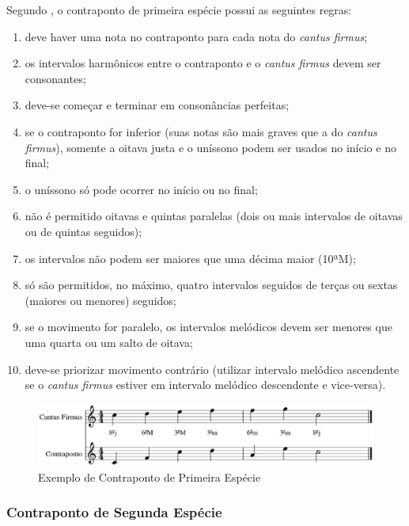         Segundo , o contraponto de primeira espécie possui as seguintes regras:

        \begin{enumerate}
          \item deve haver uma nota no contraponto para cada nota do \textit{cantus firmus};
          \item os intervalos harmônicos entre o contraponto e o \textit{cantus firmus} devem ser consonantes;
          \item deve-se começar e terminar em consonâncias perfeitas;
          \item se o contraponto for inferior (suas notas são mais graves que a do \textit{cantus firmus}), somente a oitava justa e o uníssono podem ser usados no início e no final;
          \item o uníssono só pode ocorrer no início ou no final;
          \item não é permitido oitavas e quintas paralelas (dois ou mais intervalos de oitavas ou de quintas seguidos);
          \item os intervalos não podem ser maiores que uma décima maior (10ªM);
          \item só são permitidos, no máximo, quatro intervalos seguidos de terças ou sextas (maiores ou menores) seguidos;
          \item se o movimento for paralelo, os intervalos melódicos devem ser menores que uma quarta ou um salto de oitava;
          \item deve-se priorizar movimento contrário (utilizar intervalo melódico ascendente se o \textit{cantus firmus} estiver em intervalo melódico descendente e vice-versa).
        \end{enumerate}

        \begin{figure}[htb]
          \centering
          \includegraphics[scale=0.55]{figuras/contrapontoprimeira.eps}
          \caption{Exemplo de Contraponto de Primeira Espécie}
          \label{contrapontoprimeira}
        \end{figure}

      \subsubsection[Contraponto de Segunda Espécie]{Contraponto de Segunda Espécie}

